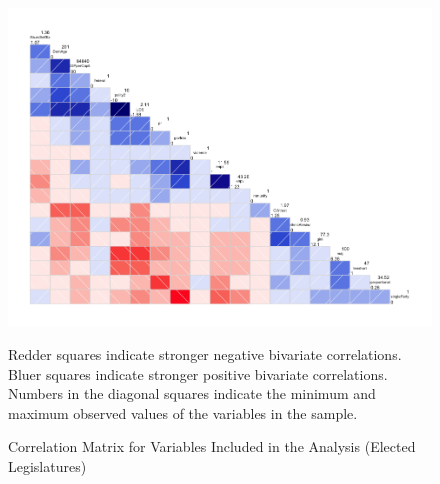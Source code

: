 \documentclass[a4paper]{article}\usepackage{graphicx, color}
\begin{document}
\begin{landscape}
\begin{figure}[t]
    \caption{Correlation Matrix for Variables Included in the Analysis (Elected Legislatures)}
    \label{corrmatrix}
    \begin{center}
    
    \includegraphics[width = \textwidth]{figure/corScatter.png}  






    \end{center}
    \begin{singlespace}
        {\scriptsize{Redder squares indicate stronger negative bivariate correlations. \\
        Bluer squares indicate stronger positive bivariate correlations. \\
        Numbers in the diagonal squares indicate the minimum and maximum observed values of the variables in the sample.
        }}
    \end{singlespace} 
\end{figure}
\end{landscape}
\end{document}
